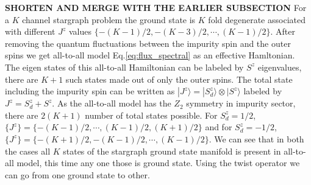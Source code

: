 \documentclass[reprint,prb,superscriptaddress]{revtex4-1}
\begin{document}
\textbf{SHORTEN AND MERGE WITH THE EARLIER SUBSECTION}
For a $K$ channel stargraph problem the ground state is $K$ fold degenerate associated with different $J^z$ values $\{-(K-1)/2,-(K-3)/2,\cdots  ,(K-1)/2 \}$. After removing the quantum fluctuations between the impurity spin and the outer spins we get all-to-all model Eq.\eqref{eq:flux_spectral} as an effective Hamltonian. The eigen states of this all-to-all Hamiltonian can be labeled by $S^z$ eigenvalues, there are $K+1$ such states made out of only the outer spins. The total state including the impurity spin can be written as $|J^z\rangle = |S_d^z\rangle \otimes |S^z\rangle$ labeled by $J^z=S_d^z+S^z$. As the all-to-all model has the $Z_2$ symmetry in impurity sector, there are $2(K+1)$ number of total states possible. For $S_d^z=1/2$, $ \{J^z\}=\{ -(K-1)/2, \cdots, (K-1)/2, (K+1)/2 \}$ and for $S_d^z=-1/2$, $\{J^z\}=\{-(K+1)/2, -(K-1)/2, \cdots,  (K-1)/2  \}$. We can see that in both the cases all $K$ states of the stargraph ground state manifold is present in all-to-all model, this time any one those is ground state. Using the twist operator we can go from one ground state to other.
%
%
%
%
\end{document}

